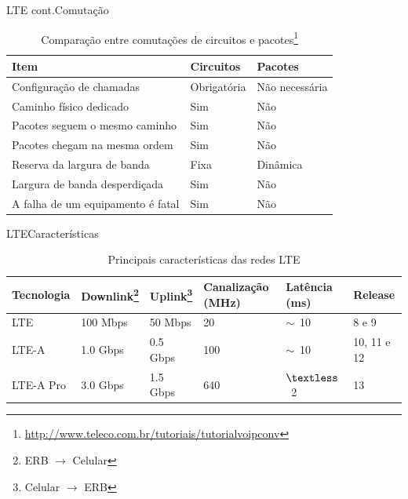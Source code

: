 \documentclass[10pt,aspectratio=169]{beamer} %
\begin{document}
\begin{frame}{LTE cont.}{Comutação}
\begin{table}[]
\begin{tabular}{l|l|l}
\hline
\textbf{Item} & \textbf{Circuitos} & \textbf{Pacotes} \\ \hline
Configuração de chamadas          & Obrigatória                     & Não necessária                \\ \hline
Caminho físico dedicado           & Sim                             & Não                           \\ \hline
Pacotes seguem o mesmo caminho    & Sim                             & Não                           \\ \hline
Pacotes chegam na mesma ordem     & Sim                             & Não                           \\ \hline
Reserva da largura de banda       & Fixa                            & Dinâmica                      \\ \hline
Largura de banda desperdiçada     & Sim                             & Não                           \\ \hline
A falha de um equipamento é fatal & Sim                             & Não                          \\ \hline
\end{tabular}
\caption{Comparação entre comutações de circuitos e pacotes\footnote{\url{http://www.teleco.com.br/tutoriais/tutorialvoipconv}}}
\end{table}
\end{frame}

\begin{frame}{LTE}{Características}
\begin{table}[]
\begin{tabular}{l|l|l|l|l|l}
Tecnologia      & Downlink\footnote{ERB $\rightarrow$ Celular} & Uplink\footnote{Celular $\rightarrow$ ERB}   & Canalização (MHz) & Latência (ms) & Release     \\ \hline
LTE             & 100 Mbps & 50 Mbps  & 20                & $\sim$~10      & 8 e 9       \\ \hline
LTE-A           & 1.0 Gbps & 0.5 Gbps & 100               & $\sim$~10      & 10, 11 e 12 \\ \hline
LTE-A Pro       & 3.0 Gbps & 1.5 Gbps & 640               & $\textless$~2   & 13         \\
\end{tabular}
\caption{Principais características das redes LTE}
\end{table}

\end{frame}
\end{document}
